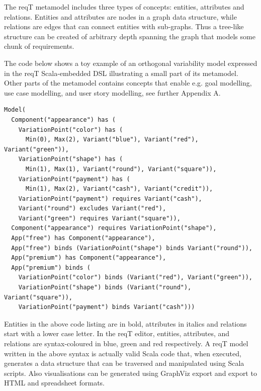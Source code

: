 \documentclass[a4paper]{llncs}
\begin{document}
The reqT metamodel includes three types of concepts: entities, attributes and relations. Entities and attributes are nodes in a graph data structure, while relations are edges that can connect entities with sub-graphs. Thus a tree-like structure can be created of arbitrary depth spanning the graph that models some chunk of requirements. 

The code below shows a toy example of an orthogonal variability model \cite{metzger2007variability} expressed in the reqT Scala-embedded DSL \cite{Regnell2013} illustrating a small part of its metamodel. Other parts of the metamodel contains concepts that enable e.g. goal modelling, %
use case modelling, and user story modelling, see further Appendix A.

\begin{spacing}{1.1}
\begin{lstlisting}
Model(
  Component("appearance") has (
    VariationPoint("color") has (
      Min(0), Max(2), Variant("blue"), Variant("red"), Variant("green")),
    VariationPoint("shape") has (
      Min(1), Max(1), Variant("round"), Variant("square")),
    VariationPoint("payment") has (
      Min(1), Max(2), Variant("cash"), Variant("credit")),
    VariationPoint("payment") requires Variant("cash"), 
    Variant("round") excludes Variant("red"),
    Variant("green") requires Variant("square")),
  Component("appearance") requires VariationPoint("shape"), 
  App("free") has Component("appearance"),  
  App("free") binds (VariationPoint("shape") binds Variant("round")),
  App("premium") has Component("appearance"),  
  App("premium") binds ( 
    VariationPoint("color") binds (Variant("red"), Variant("green")),
    VariationPoint("shape") binds (Variant("round"), Variant("square")),
    VariationPoint("payment") binds Variant("cash")))
\end{lstlisting}
\end{spacing}
\noindent Entities in the above code listing are in bold, attributes in italics and relations start with a lower case letter. In the reqT editor, entities, attributes, and relations are syntax-coloured in blue, green and red respectively. A reqT model written in the above syntax is actually valid Scala code that, when executed, generates a data structure that can be traversed and manipulated using Scala scripts. Also visualisations can be generated using GraphViz export and export to HTML and spreadsheet formats. 
\end{document}
